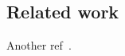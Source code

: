 \subsection{Related work}
\label{subsec:related}

Another ref~\cite{DBLP:conf/edbt/AgrawalCEKOPQ0Z16}.

